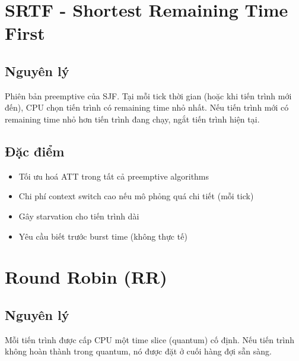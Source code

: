 \section{SRTF - Shortest Remaining Time First}

\subsection{Nguyên lý}

Phiên bản preemptive của SJF. Tại mỗi tick thời gian (hoặc khi tiến trình mới đến), 
CPU chọn tiến trình có remaining time nhỏ nhất. Nếu tiến trình mới có remaining time 
nhỏ hơn tiến trình đang chạy, ngắt tiến trình hiện tại.

\subsection{Đặc điểm}

\begin{itemize}[leftmargin=1.5cm]
  \item Tối ưu hoá ATT trong tất cả preemptive algorithms
  \item Chi phí context switch cao nếu mô phỏng quá chi tiết (mỗi tick)
  \item Gây starvation cho tiến trình dài
  \item Yêu cầu biết trước burst time (không thực tế)
\end{itemize}

\section{Round Robin (RR)}

\subsection{Nguyên lý}

Mỗi tiến trình được cấp CPU một time slice (quantum) cố định. Nếu tiến trình không 
hoàn thành trong quantum, nó được đặt ở cuối hàng đợi sẵn sàng.

